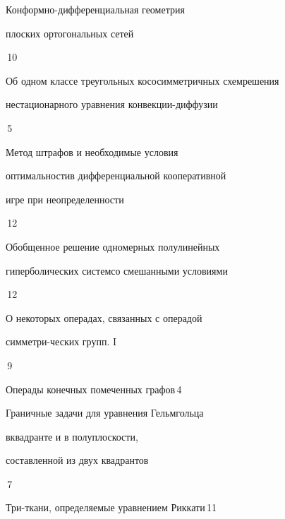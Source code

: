 

{Конформно-дифференциальная геометрия


плоских ортогональных сетей}{\No\,10}




{Об одном классе треугольных кососимметричных схем\newline решения


нестационарного уравнения конвекции-диффузии}{\No\,5}










{Метод штрафов и необходимые условия  


оптимальности\newline в дифференциальной кооперативной


игре при неопределенности}{\No\,12}




{Обобщенное решение одномерных полулинейных


гиперболических систем\newline со смешанными условиями}{\No\,12}






{О некоторых операдах, связанных с операдой 


симметри-\newline ческих групп. I}{\No\,9}




{Операды конечных помеченных графов}{\No\,4}




{Граничные задачи для уравнения Гельмгольца


в\newline квадранте и в полуплоскости,


составленной из двух квадрантов}{\No\,7}







{Три-ткани, определяемые уравнением Риккати}{\No\,11}


